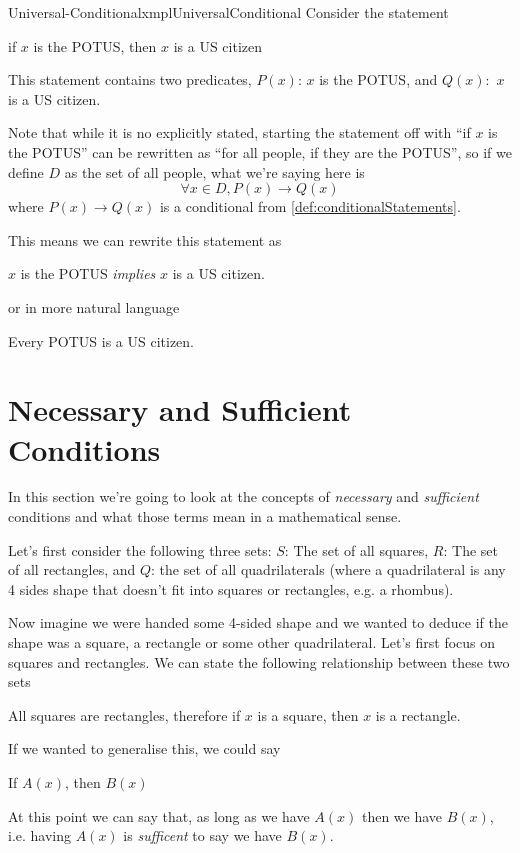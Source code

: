 \begin{exmpl}[label={exmpl:universalConditional}]{Universal-Conditional}{xmplUniversalConditional}
    Consider the statement
    \begin{center}
        if $x$ is the POTUS, then $x$ is a US citizen
    \end{center}
    This statement contains two predicates, $P(x)$: $x$ is the POTUS, and $Q(x):$ $x$ is a US citizen.

    Note that while it is no explicitly stated, starting the statement off with ``if $x$ is the POTUS'' can be rewritten as ``for all people, if they are the POTUS'', so if we define $D$ as the set of all people, what we're saying here is
    $$\forall x \in D, P(x) \to Q(x)$$
    where $P(x) \to Q(x)$ is a conditional from \cref{def:conditionalStatements}.

    This means we can rewrite this statement as
    \begin{center}
        $x$ is the POTUS \emph{implies} $x$ is a US citizen.
    \end{center}
    or in more natural language
    \begin{center}
        Every POTUS is a US citizen.
    \end{center}
\end{exmpl}

\section{Necessary and Sufficient Conditions}
In this section we're going to look at the concepts of \emph{necessary} and \emph{sufficient} conditions and what those terms mean in a mathematical sense.

Let's first consider the following three sets: $S$: The set of all squares, $R$: The set of all rectangles, and $Q$: the set of all quadrilaterals (where a quadrilateral is any 4 sides shape that doesn't fit into squares or rectangles, e.g. a rhombus).

Now imagine we were handed some 4-sided shape and we wanted to deduce if the shape was a square, a rectangle or some other quadrilateral. Let's first focus on squares and rectangles. We can state the following relationship between these two sets
\begin{center}
    All squares are rectangles, therefore if $x$ is a square, then $x$ is a rectangle.
\end{center}

If we wanted to generalise this, we could say
\begin{center}
    If $A(x)$, then $B(x)$
\end{center}
At this point we can say that, as long as we have $A(x)$ then we have $B(x)$, i.e. having $A(x)$ is \emph{sufficent} to say we have $B(x)$.

